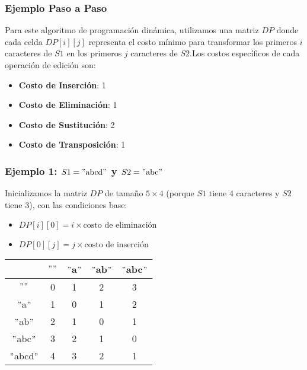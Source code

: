 \subsubsection{Ejemplo Paso a Paso}
Para este algoritmo de programación dinámica, utilizamos una matriz \( DP \) donde cada celda \( DP[i][j] \) representa el costo mínimo para transformar los primeros \( i \) caracteres de \( S1 \) en los primeros \( j \) caracteres de \( S2 \).Los costos específicos de cada operación de edición son:

\begin{itemize}
    \item \textbf{Costo de Inserción}: 1
    \item \textbf{Costo de Eliminación}: 1
    \item \textbf{Costo de Sustitución}: 2
    \item \textbf{Costo de Transposición}: 1
\end{itemize}

\subsubsection{Ejemplo 1: \( S1 = \text{$"$abcd$"$} \) y \( S2 = \text{$"$abc$"$} \)}

Inicializamos la matriz \( DP \) de tamaño \( 5 \times 4 \) (porque \( S1 \) tiene 4 caracteres y \( S2 \) tiene 3), con las condiciones base:

\begin{itemize}
    \item \( DP[i][0] = i \times \text{costo de eliminación} \)
    \item \( DP[0][j] = j \times \text{costo de inserción} \)
\end{itemize}

\begin{table}[h!]
    \centering
    \begin{tabular}{c|c|c|c|c}
        & $""$ & $"$a$"$ & $"$ab$"$ & $"$abc$"$ \\
        \hline
        $""$ & 0 & 1 & 2 & 3 \\
        $"$a$"$ & 1 & 0 & 1 & 2 \\
        $"$ab$"$ & 2 & 1 & 0 & 1 \\
        $"$abc$"$ & 3 & 2 & 1 & 0 \\
        $"$abcd$"$ & 4 & 3 & 2 & 1 \\
    \end{tabular}
\end{table}

